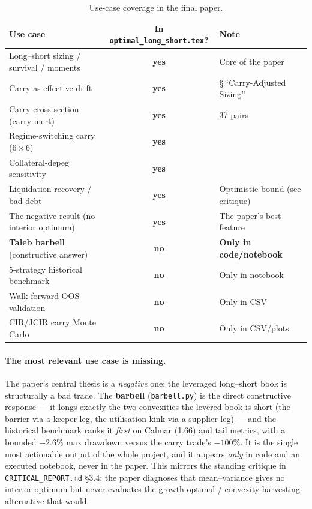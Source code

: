 \documentclass[11pt]{article}
\newcommand{\yes}{\textcolor{green!45!black}{\textbf{yes}}}
\newcommand{\no}{\textcolor{red!60!black}{\textbf{no}}}
\newcommand{\code}[1]{\texttt{\small #1}}
\begin{document}
\begin{table}[htbp]
\centering
\caption{Use-case coverage in the final paper.}
\label{tab:coverage}
\small
\begin{tabular}{p{6.8cm}c p{4.2cm}}
\toprule
\textbf{Use case} & \textbf{In \code{optimal\_long\_short.tex}?} & \textbf{Note} \\
\midrule
Long--short sizing / survival / moments & \yes & Core of the paper \\
Carry as effective drift & \yes & \S\,``Carry-Adjusted Sizing'' \\
Carry cross-section (carry inert) & \yes & 37 pairs \\
Regime-switching carry ($6\times6$) & \yes & \\
Collateral-depeg sensitivity & \yes & \\
Liquidation recovery / bad debt & \yes & Optimistic bound (see critique) \\
The negative result (no interior optimum) & \yes & The paper's best feature \\
\midrule
\rowcolor{red!8}\textbf{Taleb barbell} (constructive answer) & \no & \textbf{Only in code/notebook} \\
\rowcolor{red!8}5-strategy historical benchmark & \no & Only in notebook \\
\rowcolor{red!8}Walk-forward OOS validation & \no & Only in CSV \\
\rowcolor{red!8}CIR/JCIR carry Monte Carlo & \no & Only in CSV/plots \\
\bottomrule
\end{tabular}
\end{table}

\paragraph{The most relevant use case is missing.} The paper's central thesis is
a \emph{negative} one: the leveraged long--short book is structurally a bad
trade. The \textbf{barbell} (\code{barbell.py}) is the direct constructive
response --- it longs exactly the two convexities the levered book is short (the
barrier via a keeper leg, the utilisation kink via a supplier leg) --- and the
historical benchmark ranks it \emph{first} on Calmar (1.66) and tail metrics,
with a bounded $-2.6\%$ max drawdown versus the carry trade's $-100\%$. It is
the single most actionable output of the whole project, and it appears \emph{only}
in code and an executed notebook, never in the paper. This mirrors the standing
critique in \code{CRITICAL\_REPORT.md} \S3.4: the paper diagnoses that
mean--variance gives no interior optimum but never evaluates the growth-optimal /
convexity-harvesting alternative that would.
\end{document}
